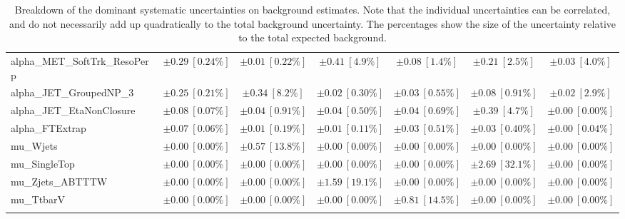\begin{sidewaystable}
\begin{center}
\begin{tabular*}{\textwidth}{@{\extracolsep{\fill}}lcccccc}
alpha\_MET\_SoftTrk\_ResoPerp         & $\pm 0.29\ [0.24\%] $          & $\pm 0.01\ [0.22\%] $          & $\pm 0.41\ [4.9\%] $          & $\pm 0.08\ [1.4\%] $          & $\pm 0.21\ [2.5\%] $          & $\pm 0.03\ [4.0\%] $       \\
alpha\_JET\_GroupedNP\_3         & $\pm 0.25\ [0.21\%] $          & $\pm 0.34\ [8.2\%] $          & $\pm 0.02\ [0.30\%] $          & $\pm 0.03\ [0.55\%] $          & $\pm 0.08\ [0.91\%] $          & $\pm 0.02\ [2.9\%] $       \\
alpha\_JET\_EtaNonClosure         & $\pm 0.08\ [0.07\%] $          & $\pm 0.04\ [0.91\%] $          & $\pm 0.04\ [0.50\%] $          & $\pm 0.04\ [0.69\%] $          & $\pm 0.39\ [4.7\%] $          & $\pm 0.00\ [0.00\%] $       \\
alpha\_FTExtrap         & $\pm 0.07\ [0.06\%] $          & $\pm 0.01\ [0.19\%] $          & $\pm 0.01\ [0.11\%] $          & $\pm 0.03\ [0.51\%] $          & $\pm 0.03\ [0.40\%] $          & $\pm 0.00\ [0.04\%] $       \\
mu\_Wjets         & $\pm 0.00\ [0.00\%] $          & $\pm 0.57\ [13.8\%] $          & $\pm 0.00\ [0.00\%] $          & $\pm 0.00\ [0.00\%] $          & $\pm 0.00\ [0.00\%] $          & $\pm 0.00\ [0.00\%] $       \\
mu\_SingleTop         & $\pm 0.00\ [0.00\%] $          & $\pm 0.00\ [0.00\%] $          & $\pm 0.00\ [0.00\%] $          & $\pm 0.00\ [0.00\%] $          & $\pm 2.69\ [32.1\%] $          & $\pm 0.00\ [0.00\%] $       \\
mu\_Zjets\_ABTTTW         & $\pm 0.00\ [0.00\%] $          & $\pm 0.00\ [0.00\%] $          & $\pm 1.59\ [19.1\%] $          & $\pm 0.00\ [0.00\%] $          & $\pm 0.00\ [0.00\%] $          & $\pm 0.00\ [0.00\%] $       \\
mu\_TtbarV         & $\pm 0.00\ [0.00\%] $          & $\pm 0.00\ [0.00\%] $          & $\pm 0.00\ [0.00\%] $          & $\pm 0.81\ [14.5\%] $          & $\pm 0.00\ [0.00\%] $          & $\pm 0.00\ [0.00\%] $       \\
\noalign{\smallskip}\hline\noalign{\smallskip}
\end{tabular*}
\end{center}
\caption[Breakdown of uncertainty on background estimates]{
Breakdown of the dominant systematic uncertainties on background estimates.
Note that the individual uncertainties can be correlated, and do not necessarily add up quadratically to 
the total background uncertainty. The percentages show the size of the uncertainty relative to the total expected background.
\label{table.results.bkgestimate.uncertainties.VRTopBTW_bybkg}}
\end{sidewaystable}
%